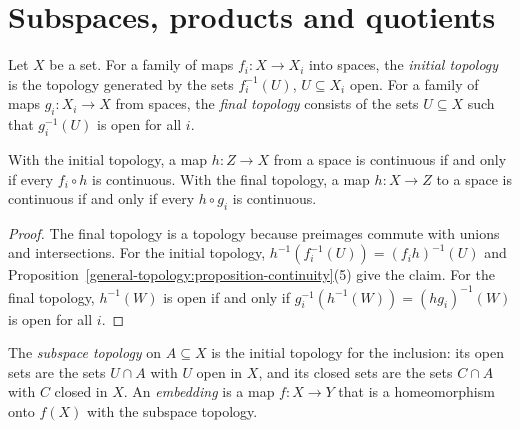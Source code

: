 \section{Subspaces, products and quotients}\label{general-topology:section-constructions}

\begin{definition}\label{general-topology:definition-initial-final}
Let $X$ be a set. For a family of maps $f_i \colon X \to X_i$ into spaces, the \emph{initial topology} is the topology generated by the sets
$f_i^{-1}(U)$, $U \subseteq X_i$ open. For a family of maps $g_i \colon X_i \to X$ from spaces, the \emph{final topology} consists of the sets
$U \subseteq X$ such that $g_i^{-1}(U)$ is open for all $i$.
\end{definition}

\begin{proposition}\label{general-topology:proposition-initial-final}
With the initial topology, a map $h \colon Z \to X$ from a space is continuous if and only if every $f_i \circ h$ is continuous. With the
final topology, a map $h \colon X \to Z$ to a space is continuous if and only if every $h \circ g_i$ is continuous.
\end{proposition}

\begin{proof}
The final topology is a topology because preimages commute with unions and intersections. For the initial topology, $h^{-1}(f_i^{-1}(U)) = (f_i h)^{-1}(U)$
and Proposition~\ref{general-topology:proposition-continuity}(5) give the claim. For the final topology, $h^{-1}(W)$ is open if and only if
$g_i^{-1}(h^{-1}(W)) = (hg_i)^{-1}(W)$ is open for all $i$.
\end{proof}

\begin{definition}\label{general-topology:definition-subspace}
The \emph{subspace topology} on $A \subseteq X$ is the initial topology for the inclusion: its open sets are the sets $U \cap A$ with $U$ open in
$X$, and its closed sets are the sets $C \cap A$ with $C$ closed in $X$. An \emph{embedding} is a map $f \colon X \to Y$ that is a homeomorphism
onto $f(X)$ with the subspace topology.
\end{definition}

